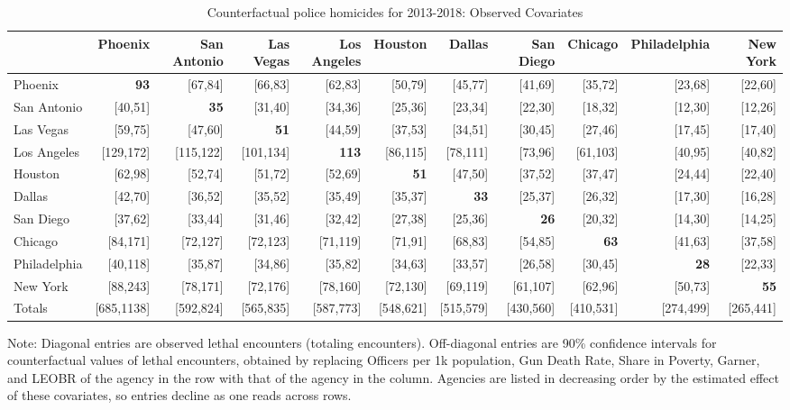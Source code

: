 \begin{table}[h!]\centering\scriptsize\tabcolsep=0.1cm\caption{Counterfactual police homicides for 2013-2018: Observed Covariates} \label{table:counterfactual_obs}\begin{tabular}{lrrrrrrrrrr}\hline \hline&Phoenix&San Antonio&Las Vegas&Los Angeles&Houston&Dallas&San Diego&Chicago&Philadelphia&New York\\
\hline
Phoenix&\textbf{93}&[67,84]&[66,83]&[62,83]&[50,79]&[45,77]&[41,69]&[35,72]&[23,68]&[22,60]\\
San Antonio&[40,51]&\textbf{35}&[31,40]&[34,36]&[25,36]&[23,34]&[22,30]&[18,32]&[12,30]&[12,26]\\
Las Vegas&[59,75]&[47,60]&\textbf{51}&[44,59]&[37,53]&[34,51]&[30,45]&[27,46]&[17,45]&[17,40]\\
Los Angeles&[129,172]&[115,122]&[101,134]&\textbf{113}&[86,115]&[78,111]&[73,96]&[61,103]&[40,95]&[40,82]\\
Houston&[62,98]&[52,74]&[51,72]&[52,69]&\textbf{51}&[47,50]&[37,52]&[37,47]&[24,44]&[22,40]\\
Dallas&[42,70]&[36,52]&[35,52]&[35,49]&[35,37]&\textbf{33}&[25,37]&[26,32]&[17,30]&[16,28]\\
San Diego&[37,62]&[33,44]&[31,46]&[32,42]&[27,38]&[25,36]&\textbf{26}&[20,32]&[14,30]&[14,25]\\
Chicago&[84,171]&[72,127]&[72,123]&[71,119]&[71,91]&[68,83]&[54,85]&\textbf{63}&[41,63]&[37,58]\\
Philadelphia&[40,118]&[35,87]&[34,86]&[35,82]&[34,63]&[33,57]&[26,58]&[30,45]&\textbf{28}&[22,33]\\
New York&[88,243]&[78,171]&[72,176]&[78,160]&[72,130]&[69,119]&[61,107]&[62,96]&[50,73]&\textbf{55}\\
\hline
Totals&[685,1138]&[592,824]&[565,835]&[587,773]&[548,621]&[515,579]&[430,560]&[410,531]&[274,499]&[265,441]\\
\hline 
 \end{tabular} 
 \begin{center} 
 \begin{minipage}{1.05\textwidth} %
 {\footnotesize Note: Diagonal entries are observed lethal encounters (totaling \totalincidentsten{} encounters). Off-diagonal entries are 90\% confidence intervals for counterfactual values of lethal encounters, obtained by replacing Officers per 1k population, Gun Death Rate, Share in Poverty, Garner, and LEOBR of the agency in the row with that of the agency in the column. Agencies are listed in decreasing order by the estimated effect of these covariates, so entries decline as one reads across rows.} 
 \end{minipage} 
 \end{center} 
 \end{table}